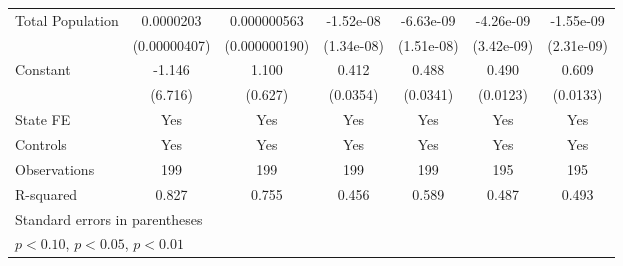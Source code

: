 {\begin{tabular}{l*{6}{c}}
\addlinespace
Total Population    &   0.0000203\sym{***}& 0.000000563\sym{***}&   -1.52e-08         &   -6.63e-09         &   -4.26e-09         &   -1.55e-09         \\
                    &(0.00000407)         &(0.000000190)         &  (1.34e-08)         &  (1.51e-08)         &  (3.42e-09)         &  (2.31e-09)         \\
\addlinespace
Constant            &      -1.146         &       1.100\sym{*}  &       0.412\sym{***}&       0.488\sym{***}&       0.490\sym{***}&       0.609\sym{***}\\
                    &     (6.716)         &     (0.627)         &    (0.0354)         &    (0.0341)         &    (0.0123)         &    (0.0133)         \\
\midrule
State FE            &         Yes         &         Yes         &         Yes         &         Yes         &         Yes         &         Yes         \\
Controls            &         Yes         &         Yes         &         Yes         &         Yes         &         Yes         &         Yes         \\
Observations        &         199         &         199         &         199         &         199         &         195         &         195         \\
R-squared           &       0.827         &       0.755         &       0.456         &       0.589         &       0.487         &       0.493         \\
\bottomrule
\multicolumn{7}{l}{\footnotesize Standard errors in parentheses}\\
\multicolumn{7}{l}{\footnotesize \sym{*} \(p<0.10\), \sym{**} \(p<0.05\), \sym{***} \(p<0.01\)}\\
\end{tabular}
}
